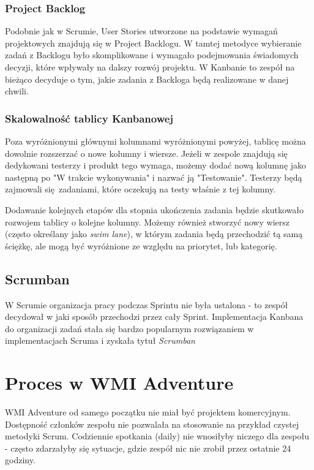 \documentclass{article}
\begin{document}
\subsubsection*{Project Backlog}
Podobnie jak w Scrumie, User Stories utworzone na podstawie wymagań projektowych znajdują się w Project Backlogu. W tamtej metodyce wybieranie zadań z Backlogu było skomplikowane i wymagało podejmowania świadomych decyzji, które wpływały na dalszy rozwój projektu. W Kanbanie to zespół na bieżąco decyduje o tym, jakie zadania z Backloga będą realizowane w danej chwili.

\subsubsection*{Skalowalność tablicy Kanbanowej}
Poza wyróżnionymi głównymi kolumnami wyróżnionymi powyżej, tablicę można dowolnie rozszerzać o nowe kolumny i wiersze. Jeżeli w zespole znajdują się dedykowani testerzy i produkt tego wymaga, możemy dodać nową kolumnę jako następną po "W trakcie wykonywania" i nazwać ją "Testowanie". Testerzy będą zajmowali się zadaniami, które oczekują na testy właśnie z tej kolumny.

Dodawanie kolejnych etapów dla stopnia ukończenia zadania będzie skutkowało rozwojem tablicy o kolejne kolumny. Możemy również stworzyć nowy wiersz (często określany jako \textit{swim lane}), w którym zadania będą przechodzić tą samą ściężkę, ale mogą być wyróżnione ze względu na priorytet, lub kategorię.

\subsection{Scrumban}
W Scrumie organizacja pracy podczas Sprintu nie była ustalona - to zespół decydował w jaki sposób przechodzi przez cały Sprint. Implementacja Kanbana do organizacji zadań stała się bardzo popularnym rozwiązaniem w implementacjach Scruma i zyskała tytuł \textit{Scrumban}


\section{Proces w WMI Adventure}
WMI Adventure od samego początku nie miał być projektem komercyjnym. Dostępność członków zespołu nie pozwalała na stosowanie na przykład czystej metodyki Scrum. Codziennie spotkania (daily) nie wnosiłyby niczego dla zespołu - często zdarzałyby się sytuacje, gdzie zespół nic nie zrobił przez ostatnie 24 godziny.
\end{document}

